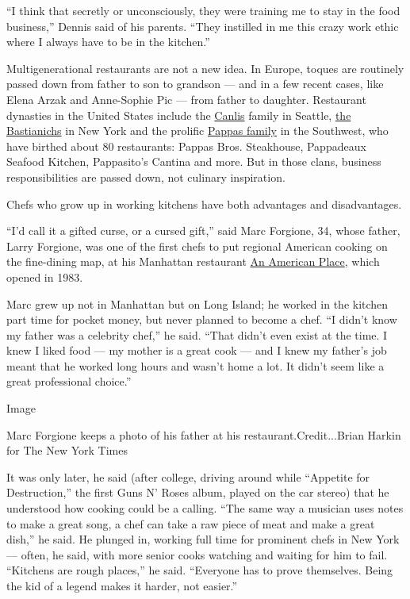 ``I think that secretly or unconsciously, they were training me to stay
in the food business,'' Dennis said of his parents. ``They instilled in
me this crazy work ethic where I always have to be in the kitchen.''

Multigenerational restaurants are not a new idea. In Europe, toques are
routinely passed down from father to son to grandson --- and in a few
recent cases, like Elena Arzak and Anne-Sophie Pic --- from father to
daughter. Restaurant dynasties in the United States include the
\href{http://canlis.com/}{Canlis} family in Seattle,
\href{http://bandbhg.com/our_restaurants.cfm}{the Bastianichs} in New
York and the prolific \href{http://www.pappas.com/home/}{Pappas family}
in the Southwest, who have birthed about 80 restaurants: Pappas Bros.
Steakhouse, Pappadeaux Seafood Kitchen, Pappasito's Cantina and more.
But in those clans, business responsibilities are passed down, not
culinary inspiration.

Chefs who grow up in working kitchens have both advantages and
disadvantages.

``I'd call it a gifted curse, or a cursed gift,'' said Marc Forgione,
34, whose father, Larry Forgione, was one of the first chefs to put
regional American cooking on the fine-dining map, at his Manhattan
restaurant
\href{http://events.nytimes3xbfgragh.onion/mem/nycreview.html?res=9C02E0D61E39F93BA2575BC0A96F958260}{An
American Place}, which opened in 1983.

Marc grew up not in Manhattan but on Long Island; he worked in the
kitchen part time for pocket money, but never planned to become a chef.
``I didn't know my father was a celebrity chef,'' he said. ``That didn't
even exist at the time. I knew I liked food --- my mother is a great
cook --- and I knew my father's job meant that he worked long hours and
wasn't home a lot. It didn't seem like a great professional choice.''

Image

Marc Forgione keeps a photo of his father at his
restaurant.Credit...Brian Harkin for The New York Times

It was only later, he said (after college, driving around while
``Appetite for Destruction,'' the first Guns N' Roses album, played on
the car stereo) that he understood how cooking could be a calling. ``The
same way a musician uses notes to make a great song, a chef can take a
raw piece of meat and make a great dish,'' he said. He plunged in,
working full time for prominent chefs in New York --- often, he said,
with more senior cooks watching and waiting for him to fail. ``Kitchens
are rough places,'' he said. ``Everyone has to prove themselves. Being
the kid of a legend makes it harder, not easier.''

